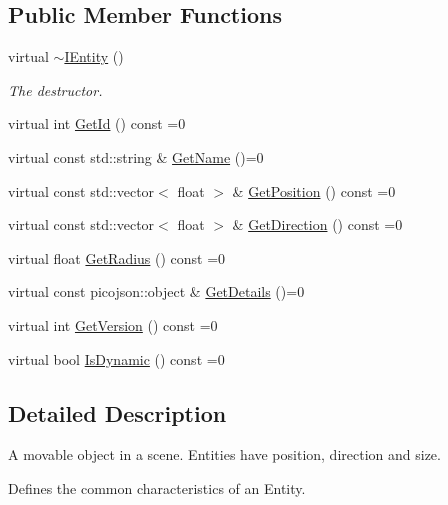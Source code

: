 \subsection*{Public Member Functions}
\begin{DoxyCompactItemize}
\item 
\mbox{\label{classentity__project_1_1IEntity_a37acee64a35e2bfaccf294d20be16b7f}} 
virtual \hyperlink{classentity__project_1_1IEntity_a37acee64a35e2bfaccf294d20be16b7f}{$\sim$\+I\+Entity} ()
\begin{DoxyCompactList}\small\item\em The destructor. \end{DoxyCompactList}\item 
virtual int \hyperlink{classentity__project_1_1IEntity_a87f9d99f58cdc28b654ae9a6d82fbff6}{Get\+Id} () const =0
\item 
virtual const std\+::string \& \hyperlink{classentity__project_1_1IEntity_a60fe17f543af26a48181a0c290a822ab}{Get\+Name} ()=0
\item 
virtual const std\+::vector$<$ float $>$ \& \hyperlink{classentity__project_1_1IEntity_a1369c59d258645a12a06239ece1134cf}{Get\+Position} () const =0
\item 
virtual const std\+::vector$<$ float $>$ \& \hyperlink{classentity__project_1_1IEntity_a385dad034b5a86666df9fc979a3d1d1b}{Get\+Direction} () const =0
\item 
virtual float \hyperlink{classentity__project_1_1IEntity_af2c2f81a5d201c4c1968f055808ba59c}{Get\+Radius} () const =0
\item 
virtual const picojson\+::object \& \hyperlink{classentity__project_1_1IEntity_a73c5b6deac9e2659160d2952ae7572c4}{Get\+Details} ()=0
\item 
virtual int \hyperlink{classentity__project_1_1IEntity_a254b8c22f103ebf23261cb79bc121118}{Get\+Version} () const =0
\item 
virtual bool \hyperlink{classentity__project_1_1IEntity_a58d710abd04e533123d033a7ba80f017}{Is\+Dynamic} () const =0
\end{DoxyCompactItemize}


\subsection{Detailed Description}
A movable object in a scene. Entities have position, direction and size. 

Defines the common characteristics of an Entity.

